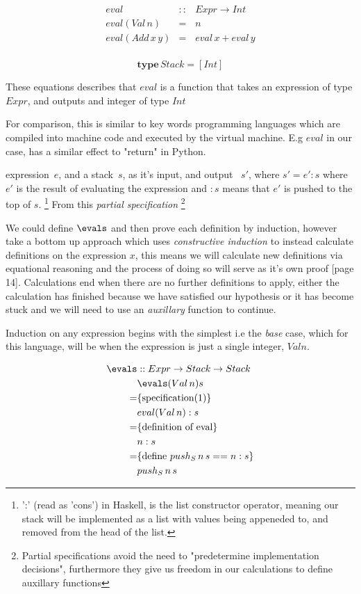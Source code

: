 \documentclass {article}
\begin{document}
\newcommand{\eval}{\emph{eval}}

\begin{eqnarray*}
	 eval &::& Expr \rightarrow Int \\ 
	 eval (Val \, n) &=& n \\
	 eval (Add \, x \, y) &=& eval \, x + eval \, y \\
\end{eqnarray*}

	\[ \textbf{type} \, Stack = [Int]\]

These equations describes that $eval$ is a function that takes
an expression of type $Expr$, and outputs and integer of type
$Int$

For comparison, this is similar to key words programming
languages which are compiled into machine code and executed
by the virtual machine.
E.g $eval$ in our case, has a similar effect to 
"return" in Python.

expression~$e$, and a stack~$s$, as it's input, and output ~$s'$, where \(s' = e':s \) where $e'$ is the result of evaluating the expression and $:s$ means that $e'$ is pushed to the top of $s$.
\footnote{':' (read as 'cons') in Haskell, is the list constructor operator, meaning our stack will be implemented as a list with values being appeneded to, and removed from the head of the list.}
From this \emph{partial specification}
\footnote{Partial specifications avoid the need to "predetermine implementation decisions", furthermore they give us freedom in our calculations to define auxillary functions} 

We could define $\evals$ and then prove each definition by induction, however \BH take a bottom up approach  which uses \emph{constructive induction \cite{backhouse}} to instead calculate definitions 
on the expression $x$, this means we will calculate new definitions via equational reasoning and the process of doing so will serve as it's own proof \cite{bandh}[page 14].
Calculations end when there are no further definitions to apply, either the calculation has finished because we have satisfied our hypothesis or it has become stuck and we will need to use an \emph{auxillary} function to continue. 

Induction on any expression begins with the simplest i.e the \emph{base} case,
which for this language, will be when the expression is just a single integer, $Val n$.

\newcommand{\pushs}{push_{S}}

\begin{eqnarray*}
	\evals & :: Expr \rightarrow Stack \rightarrow Stack \\
		  & \evals (Val \, n) s \\
	=	  & \{\mbox{specification(1)}\} \\
		  & eval (Val \, n):s \\ 
	=	  & \{\mbox{definition of eval}\} \\
		  & n:s \\
	=	  & \{\mbox{define $\pushs \, n \, s == n : s$}\} \\
		  & \pushs \, n \, s \\
\end{eqnarray*}
\end{document}
